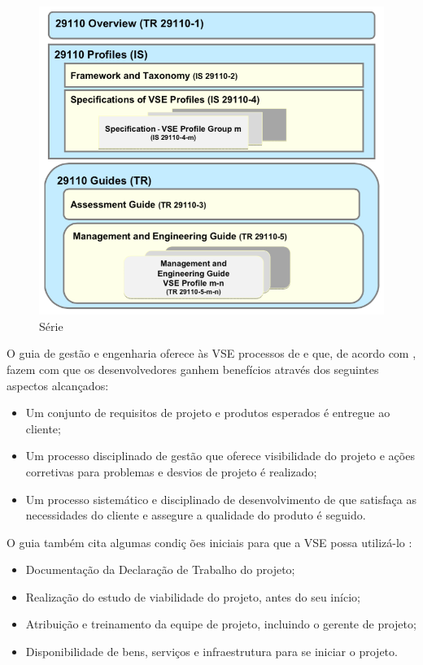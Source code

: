\begin{figure}[!h]
\centering
\includegraphics[scale=0.4]{figuras/serie_iso.png}
\caption{Série \iso \cite[pág. 7]{iso}}
\label{fig:serie:iso}
\end{figure}

O guia de gestão e engenharia oferece às VSE processos de \gp e \dsw que, de acordo com \cite{iso}, fazem com que os desenvolvedores ganhem benefícios através dos seguintes aspectos alcançados:

\begin{itemize}

\item Um conjunto de requisitos de projeto e produtos esperados é entregue ao cliente;

\item Um processo disciplinado de gestão que oferece visibilidade do projeto e ações corretivas para problemas e desvios de projeto é realizado;

\item Um processo sistemático e disciplinado de desenvolvimento de \sw que satisfaça as necessidades do cliente e assegure a qualidade do produto é seguido.

\end{itemize}

O guia também cita algumas condiç	ões iniciais para que a VSE possa utilizá-lo \citep{iso}:

\begin{itemize}

\item Documentação da Declaração de Trabalho do projeto;

\item Realização do estudo de viabilidade do projeto, antes do seu início;

\item Atribuição e treinamento da equipe de projeto, incluindo o gerente de projeto;

\item Disponibilidade de bens, serviços e infraestrutura para se iniciar o projeto.

\end{itemize}

